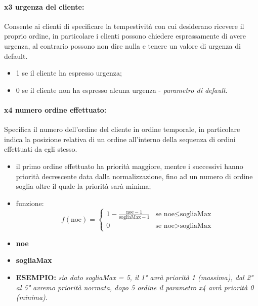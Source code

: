 \paragraph{x3 urgenza del cliente:}
Consente ai clienti di specificare la tempestività con cui desiderano ricevere il proprio ordine, in particolare i clienti possono chiedere espressamente di avere urgenza, al contrario possono non dire nulla e tenere un valore di urgenza di default.
\begin{itemize}
	\item 1 se il cliente ha espresso urgenza;
	\item 0 se il cliente non ha espresso alcuna urgenza - \textit{parametro di default}.
\end{itemize}

\paragraph{x4 numero ordine effettuato:}
Specifica il numero dell’ordine del cliente in ordine temporale, in particolare indica la posizione relativa di un ordine all'interno della sequenza di ordini effettuati da egli stesso.
\begin{itemize}

	\item il primo ordine effettuato ha priorità maggiore, mentre i successivi hanno priorità decrescente data dalla normalizzazione, fino ad un numero di ordine soglia oltre il quale la priorità sarà minima;
	
	\item funzione: \[ f(\text{noe}) = \begin{cases} 1 - \frac{{\text{noe} - 1}}{{\text{sogliaMax} - 1}} & \text{se } \text{noe} \leq \text{sogliaMax} \\ 0 & \text{se } \text{noe} > \text{sogliaMax} \end{cases} \]

	\item \textbf{noe} 
	\item \textbf{sogliaMax} 
	\item \textbf{ESEMPIO: } \textit{sia dato sogliaMax = 5, il 1° avrà priorità 1 (massima), dal 2° al 5° avremo priorità normata, dopo 5 ordine il parametro x4 avrà priorità 0 (minima).}
\end{itemize}

